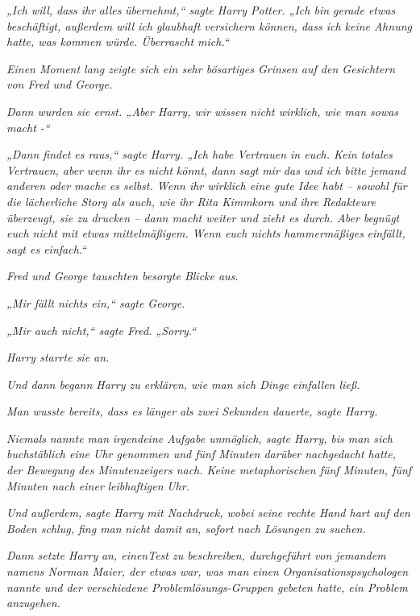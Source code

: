 {\emph{„Ich will, dass ihr} \emph{\emph{alles}} \emph{übernehmt,“ sagte Harry Potter. „Ich bin gerade etwas beschäftigt, außerdem will ich glaubhaft versichern können, dass ich keine Ahnung hatte, was kommen würde. Überrascht mich.“}

\emph{Einen Moment lang zeigte sich ein sehr bösartiges Grinsen auf den Gesichtern von Fred und George.}

\emph{Dann wurden sie ernst. „Aber Harry, wir wissen nicht wirklich, wie man sowas macht -“}

\emph{„Dann findet es raus,“ sagte Harry. „Ich habe Vertrauen in euch. Kein} \emph{\emph{totales}} \emph{Vertrauen, aber} \emph{wenn ihr es nicht} \emph{\emph{könnt,}} \emph{dann} \emph{\emph{sagt}} \emph{mir das und ich bitte jemand anderen oder mache es selbst. Wenn ihr wirklich eine gute Idee habt} \emph{-- sowohl für die lächerliche Story als auch, wie ihr Rita Kimmkorn und} \emph{ihre} \emph{Redakteure überzeugt, sie zu drucken -- dann macht weiter und zieht es durch. Aber begnügt euch nicht mit etwas mittelmäßigem. Wenn euch nichts} \emph{\emph{hammermäßiges}} \emph{einfällt, sagt es einfach.“}

\emph{Fred und George tauschten besorgte Blicke aus.}

\emph{„Mir fällt nichts ein,“ sagte George.}

\emph{„Mir auch nicht,“ sagte Fred. „Sorry.“}

\emph{Harry starrte sie an.}

\emph{Und dann begann Harry zu erklären, wie man sich Dinge einfallen ließ.}

\emph{Man wusste bereits, dass es länger als zwei Sekunden dauerte, sagte Harry.}

\emph{\emph{Niemals}} \emph{nannte man} \emph{\emph{irgendeine}} \emph{Aufgabe unmöglich, sagte Harry,} \emph{bis man sich buchstäblich eine Uhr genommen und fünf Minuten darüber nachgedacht hatte,} \emph{der Bewegung des Minutenzeigers nach. Keine metaphorischen fünf Minuten, fünf Minuten nach einer} \emph{leibhaftigen} \emph{Uhr.}

\emph{Und} \emph{\emph{außerdem}\emph{,}} \emph{sagte Harry} \emph{mit Nachdruck, wobei seine rechte Hand hart auf den Boden schlug, fing man} \emph{\emph{nicht}} \emph{damit an, sofort nach Lösungen zu suchen.}

\emph{Dann setzte Harry} \emph{an, einenTest zu beschreiben, durchgeführt von jemandem namens Norman Maier, der etwas war, was man} \emph{einen} \emph{Organisationspsychologen} \emph{nannte und der verschiedene Problemlösungs-Gruppen gebeten hatte, ein Problem anzugehen.}

}
